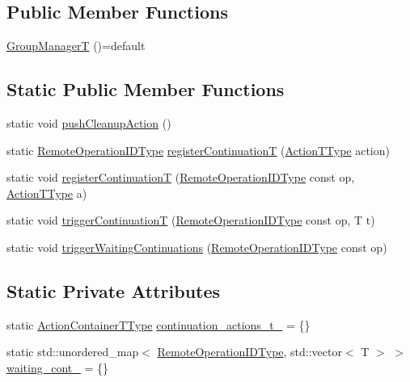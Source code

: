 \subsection*{Public Member Functions}
\begin{DoxyCompactItemize}
\item 
\hyperlink{structvt_1_1group_1_1_group_manager_t_a751380e18149d43fefffd79d22d96ebc}{Group\+ManagerT} ()=default
\end{DoxyCompactItemize}
\subsection*{Static Public Member Functions}
\begin{DoxyCompactItemize}
\item 
static void \hyperlink{structvt_1_1group_1_1_group_manager_t_ad149f3bfcb76761f22283a1bf6b147d0}{push\+Cleanup\+Action} ()
\item 
static \hyperlink{namespacevt_1_1group_a73f2624ddeb535b39a08b6524f26b244}{Remote\+Operation\+I\+D\+Type} \hyperlink{structvt_1_1group_1_1_group_manager_t_aa52eafbcdd4d1e8da4f17ef4cd03098a}{register\+ContinuationT} (\hyperlink{structvt_1_1group_1_1_group_manager_t_acb20922687d3165d97de391fdbaf02ca}{Action\+T\+Type} action)
\item 
static void \hyperlink{structvt_1_1group_1_1_group_manager_t_a7cc0fcbe3319335031839ed50590be16}{register\+ContinuationT} (\hyperlink{namespacevt_1_1group_a73f2624ddeb535b39a08b6524f26b244}{Remote\+Operation\+I\+D\+Type} const op, \hyperlink{structvt_1_1group_1_1_group_manager_t_acb20922687d3165d97de391fdbaf02ca}{Action\+T\+Type} a)
\item 
static void \hyperlink{structvt_1_1group_1_1_group_manager_t_aae5c5918bcdd2add07289c8f5eec1cc8}{trigger\+ContinuationT} (\hyperlink{namespacevt_1_1group_a73f2624ddeb535b39a08b6524f26b244}{Remote\+Operation\+I\+D\+Type} const op, T t)
\item 
static void \hyperlink{structvt_1_1group_1_1_group_manager_t_a4f0e3158204d5188d9e0881b2017ae87}{trigger\+Waiting\+Continuations} (\hyperlink{namespacevt_1_1group_a73f2624ddeb535b39a08b6524f26b244}{Remote\+Operation\+I\+D\+Type} const op)
\end{DoxyCompactItemize}
\subsection*{Static Private Attributes}
\begin{DoxyCompactItemize}
\item 
static \hyperlink{structvt_1_1group_1_1_group_manager_t_adc0d6d680c4f8bdbb80cd90f84a5f7ee}{Action\+Container\+T\+Type} \hyperlink{structvt_1_1group_1_1_group_manager_t_ace6828eddb4d595c12ea5c07047207d6}{continuation\+\_\+actions\+\_\+t\+\_\+} = \{\}
\item 
static std\+::unordered\+\_\+map$<$ \hyperlink{namespacevt_1_1group_a73f2624ddeb535b39a08b6524f26b244}{Remote\+Operation\+I\+D\+Type}, std\+::vector$<$ T $>$ $>$ \hyperlink{structvt_1_1group_1_1_group_manager_t_a294adcb4f4b41892733f29b9dea70f9e}{waiting\+\_\+cont\+\_\+} = \{\}
\end{DoxyCompactItemize}
